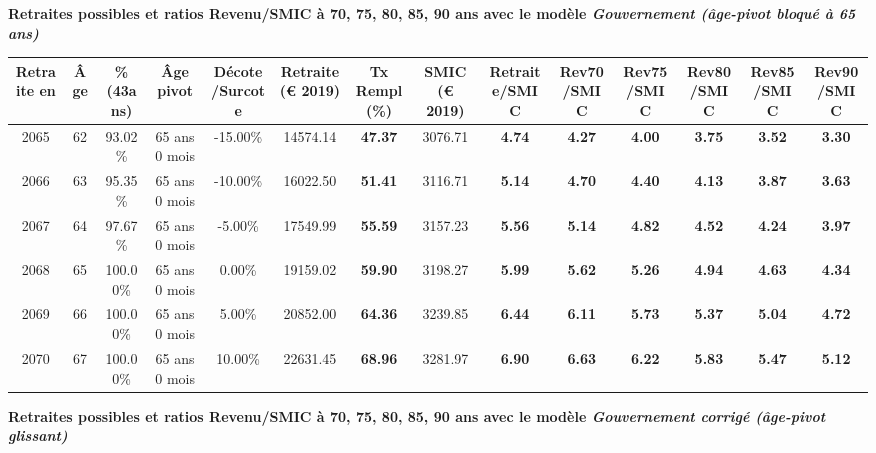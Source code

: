 {\bf \noindent Retraites possibles et ratios Revenu/SMIC à 70, 75, 80, 85, 90 ans avec le modèle \emph{Gouvernement (âge-pivot bloqué à 65 ans)}}  
 
\begin{adjustbox}{max width=\textwidth} 
\begin{tabular}[htb]{|c|c||c|c|c||c|c||c||c|c|c|c|c|c|} 
\hline 
 Retraite en &  Âge &  \%(43ans) &  Âge pivot &  Décote/Surcote &  Retraite (\euro{} 2019) &  Tx Rempl(\%) &  SMIC (\euro{} 2019) &  Retraite/SMIC &  Rev70/SMIC &  Rev75/SMIC &  Rev80/SMIC &  Rev85/SMIC &  Rev90/SMIC \\ 
\hline \hline 
 2065 &  62 &  93.02\% &  65 ans 0 mois &  -15.00\% &  14574.14 &  {\bf 47.37} &  3076.71 &  {\bf 4.74} &  {\bf 4.27} &  {\bf 4.00} &  {\bf 3.75} &  {\bf 3.52} &  {\bf 3.30} \\ 
\hline 
 2066 &  63 &  95.35\% &  65 ans 0 mois &  -10.00\% &  16022.50 &  {\bf 51.41} &  3116.71 &  {\bf 5.14} &  {\bf 4.70} &  {\bf 4.40} &  {\bf 4.13} &  {\bf 3.87} &  {\bf 3.63} \\ 
\hline 
 2067 &  64 &  97.67\% &  65 ans 0 mois &  -5.00\% &  17549.99 &  {\bf 55.59} &  3157.23 &  {\bf 5.56} &  {\bf 5.14} &  {\bf 4.82} &  {\bf 4.52} &  {\bf 4.24} &  {\bf 3.97} \\ 
\hline 
 2068 &  65 &  100.00\% &  65 ans 0 mois &  0.00\% &  19159.02 &  {\bf 59.90} &  3198.27 &  {\bf 5.99} &  {\bf 5.62} &  {\bf 5.26} &  {\bf 4.94} &  {\bf 4.63} &  {\bf 4.34} \\ 
\hline 
 2069 &  66 &  100.00\% &  65 ans 0 mois &  5.00\% &  20852.00 &  {\bf 64.36} &  3239.85 &  {\bf 6.44} &  {\bf 6.11} &  {\bf 5.73} &  {\bf 5.37} &  {\bf 5.04} &  {\bf 4.72} \\ 
\hline 
 2070 &  67 &  100.00\% &  65 ans 0 mois &  10.00\% &  22631.45 &  {\bf 68.96} &  3281.97 &  {\bf 6.90} &  {\bf 6.63} &  {\bf 6.22} &  {\bf 5.83} &  {\bf 5.47} &  {\bf 5.12} \\ 
\hline 
\hline 
\end{tabular} 
\end{adjustbox} 
 
 \vspace{0.1cm} 
{\bf \noindent Retraites possibles et ratios Revenu/SMIC à 70, 75, 80, 85, 90 ans avec le modèle \emph{Gouvernement corrigé (âge-pivot glissant)}}  
 
